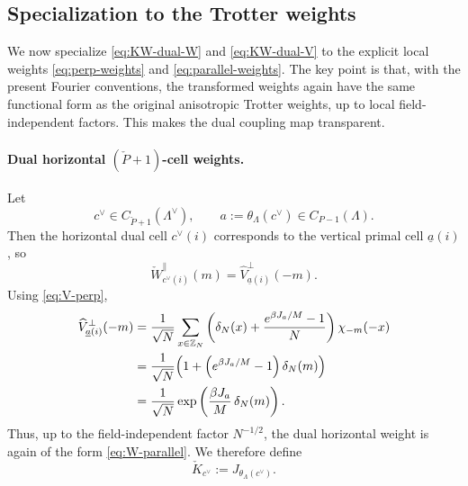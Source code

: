 \documentclass[dvipsnames,a4paper]{article}
\numberwithin{equation}{section}
\theoremstyle{definition}
\theoremstyle{remark}
\begin{document}
\subsection{Specialization to the Trotter weights}
\label{sec:KW-Trotter}

We now specialize \eqref{eq:KW-dual-W} and \eqref{eq:KW-dual-V} to the explicit local
weights \eqref{eq:perp-weights} and \eqref{eq:parallel-weights}. The key point is that,
with the present Fourier conventions, the transformed weights again have the same functional
form as the original anisotropic Trotter weights, up to local field-independent factors.
This makes the dual coupling map transparent.

\paragraph{Dual horizontal \((\check P+1)\)-cell weights.}
Let
\begin{equation}
c^\vee\in C_{\check P+1}(\Lambda^\vee),
\qquad
a:=\theta_\Lambda(c^\vee)\in C_{P-1}(\Lambda).
\end{equation}
Then the horizontal dual cell \(c^\vee(i)\) corresponds to the vertical primal cell
\(\underline a(i)\), so
\begin{equation}
	\check W_{c^\vee(i)}^{\parallel}(m)
	=
	\widehat V_{\underline a(i)}^{\perp}(-m).
\end{equation}
Using \eqref{eq:V-perp},
\begin{align}
	\widehat V_{\underline a(i)}^{\perp}(-m)
	&=
	\frac{1}{\sqrt N}\sum_{x\in \mathbb Z_N}
	\left(
	\delta_N(x)+\frac{e^{\beta J_a/M}-1}{N}
	\right)\chi_{-m}(-x)
	\nonumber\\
	&=
	\frac{1}{\sqrt N}
	\Bigl(
	1+\left(e^{\beta J_a/M}-1\right)\delta_N(m)
	\Bigr)
	\nonumber\\
	&=
	\frac{1}{\sqrt N}\exp \left(\frac{\beta J_a}{M}\,\delta_N(m)\right).
	\label{eq:KW-dual-horizontal-W-explicit}
\end{align}
Thus, up to the field-independent factor \(N^{-1/2}\), the dual horizontal weight is again
of the form \eqref{eq:W-parallel}. We therefore define
\begin{equation}
	\check K_{c^\vee}:=J_{\theta_\Lambda(c^\vee)}.
	\label{eq:KW-dual-K-def}
\end{equation}
\end{document}
